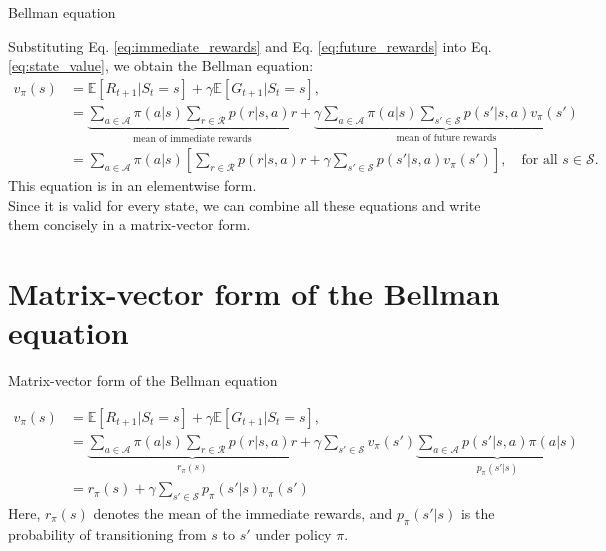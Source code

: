 \documentclass[aspectratio=169,xcolor=dvipsnames]{beamer}
\begin{document}

\begin{frame}{Bellman equation}

Substituting Eq. \ref{eq:immediate_rewards} and Eq. \ref{eq:future_rewards} into Eq. \ref{eq:state_value}, we obtain the Bellman equation:
\begin{equation} \label{eq:bellman_equation}
	\begin{aligned}
		v_{\pi}(s) 
		&= \mathbb{E}[R_{t + 1} | S_t = s] + \gamma \mathbb{E}[G_{t + 1} | S_t = s], \\
		&= \underbrace{
				\sum_{a \in \mathcal{A}} \pi(a | s)
				\sum_{r \in \mathcal{R}} p(r | s, a) r
			}_{\text{mean of immediate rewards}}
			+ \underbrace{
				\gamma \sum_{a \in \mathcal{A}} \pi(a | s) 
				\sum_{s' \in \mathcal{S}} p(s' | s, a) v_{\pi}(s')
			}_{\text{mean of future rewards}} \\
		&= \sum_{a \in \mathcal{A}} \pi(a | s)
		\left[
			\sum_{r \in \mathcal{R}} p(r | s, a) r +
			\gamma \sum_{s' \in \mathcal{S}} p(s' | s, a) v_{\pi}(s')
		\right],
		\quad \text{for all } s \in \mathcal{S}.
	\end{aligned}
\end{equation}
This equation is in an elementwise form. \\
Since it is valid for every state, we can combine all these equations and write them concisely in a matrix-vector form.

\end{frame}

\section{Matrix-vector form of the Bellman equation}


\begin{frame}{Matrix-vector form of the Bellman equation}

\begin{equation} \label{eq:bellman_equation_matrix}
	\begin{aligned}
		v_{\pi}(s) 
		&= \mathbb{E}[R_{t + 1} | S_t = s] + \gamma \mathbb{E}[G_{t + 1} | S_t = s], \\
		&= \underbrace{
				\sum_{a \in \mathcal{A}} \pi(a | s)
				\sum_{r \in \mathcal{R}} p(r | s, a) r
			}_{r_\pi(s)}
			+ \gamma \sum_{s' \in \mathcal{S}} v_\pi(s')
			\underbrace{ 
				\sum_{a \in \mathcal{A}} p(s'|s, a) \pi(a|s)
			}_{p_\pi(s'|s)} \\
		&= r_\pi(s) + \gamma \sum_{s' \in \mathcal{S}} p_\pi(s'|s) v_\pi(s')
	\end{aligned}
\end{equation}
Here, $r_\pi(s)$ denotes the mean of the immediate rewards, and $p_\pi(s'|s)$ is the probability of transitioning from $s$ to $s'$ under policy $\pi$.

\end{frame}
\end{document}
